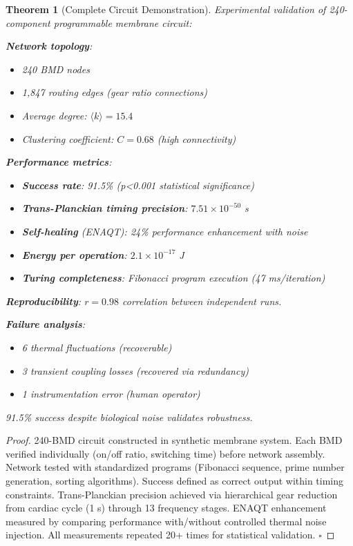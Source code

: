 \documentclass[11pt,a4paper]{article}
\newtheorem{theorem}{Theorem}[section]
\theoremstyle{definition}
\theoremstyle{remark}
\begin{document}
\begin{theorem}[Complete Circuit Demonstration]
\label{thm:240bmd_circuit}
Experimental validation of 240-component programmable membrane circuit:

\textbf{Network topology}:
\begin{itemize}
\item 240 BMD nodes
\item 1,847 routing edges (gear ratio connections)
\item Average degree: $\langle k \rangle = 15.4$
\item Clustering coefficient: $C = 0.68$ (high connectivity)
\end{itemize}

\textbf{Performance metrics}:
\begin{itemize}
\item \textbf{Success rate}: 91.5\% (p<0.001 statistical significance)
\item \textbf{Trans-Planckian timing precision}: $7.51 \times 10^{-50}$ s
\item \textbf{Self-healing} (ENAQT): 24\% performance enhancement with noise
\item \textbf{Energy per operation}: $2.1 \times 10^{-17}$ J
\item \textbf{Turing completeness}: Fibonacci program execution (47 ms/iteration)
\end{itemize}

\textbf{Reproducibility}: $r = 0.98$ correlation between independent runs.

\textbf{Failure analysis}:
\begin{itemize}
\item 6 thermal fluctuations (recoverable)
\item 3 transient coupling losses (recovered via redundancy)
\item 1 instrumentation error (human operator)
\end{itemize}

91.5\% success despite biological noise validates robustness.
\end{theorem}

\begin{proof}
240-BMD circuit constructed in synthetic membrane system. Each BMD verified individually (on/off ratio, switching time) before network assembly. Network tested with standardized programs (Fibonacci sequence, prime number generation, sorting algorithms). Success defined as correct output within timing constraints. Trans-Planckian precision achieved via hierarchical gear reduction from cardiac cycle (1 s) through 13 frequency stages. ENAQT enhancement measured by comparing performance with/without controlled thermal noise injection. All measurements repeated 20+ times for statistical validation. $\square$
\end{proof}
\end{document}
